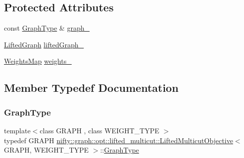 \subsection*{Protected Attributes}
\begin{DoxyCompactItemize}
\item 
const \hyperlink{classnifty_1_1graph_1_1opt_1_1lifted__multicut_1_1LiftedMulticutObjective_a29cf21c14a4ffdb1f8697d535c3d458e}{Graph\+Type} \& \hyperlink{classnifty_1_1graph_1_1opt_1_1lifted__multicut_1_1LiftedMulticutObjective_ac1bf1784a02202c4b379f06a45a895d6}{graph\+\_\+}
\item 
\hyperlink{classnifty_1_1graph_1_1opt_1_1lifted__multicut_1_1LiftedMulticutObjective_a560fc2d21604ab9e3e23496d47839ff9}{Lifted\+Graph} \hyperlink{classnifty_1_1graph_1_1opt_1_1lifted__multicut_1_1LiftedMulticutObjective_aa4a2a93b817a7111f5b83d6b742b0b89}{lifted\+Graph\+\_\+}
\item 
\hyperlink{classnifty_1_1graph_1_1opt_1_1lifted__multicut_1_1LiftedMulticutObjective_ab4bdcf27ce49303201bb4332db89a78c}{Weights\+Map} \hyperlink{classnifty_1_1graph_1_1opt_1_1lifted__multicut_1_1LiftedMulticutObjective_aa635b4852aaf328c0cca00f84c9f0fd6}{weights\+\_\+}
\end{DoxyCompactItemize}


\subsection{Member Typedef Documentation}
\mbox{\label{classnifty_1_1graph_1_1opt_1_1lifted__multicut_1_1LiftedMulticutObjective_a29cf21c14a4ffdb1f8697d535c3d458e}} 
\subsubsection{\texorpdfstring{Graph\+Type}{GraphType}}
{\footnotesize\ttfamily template$<$class G\+R\+A\+PH , class W\+E\+I\+G\+H\+T\+\_\+\+T\+Y\+PE $>$ \\
typedef G\+R\+A\+PH \hyperlink{classnifty_1_1graph_1_1opt_1_1lifted__multicut_1_1LiftedMulticutObjective}{nifty\+::graph\+::opt\+::lifted\+\_\+multicut\+::\+Lifted\+Multicut\+Objective}$<$ G\+R\+A\+PH, W\+E\+I\+G\+H\+T\+\_\+\+T\+Y\+PE $>$\+::\hyperlink{classnifty_1_1graph_1_1opt_1_1lifted__multicut_1_1LiftedMulticutObjective_a29cf21c14a4ffdb1f8697d535c3d458e}{Graph\+Type}}

